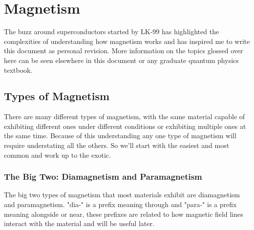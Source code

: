 
\section{Magnetism}
\label{showcase:magnetism}
The buzz around superconductors started by LK-99 has highlighted the complexities of understanding how magnetism works and has inspired me to write this document as personal revision.
More information on the topics glossed over here can be seen elsewhere in this document or any graduate quantum physics textbook.

\subsection{Types of Magnetism}
There are many different types of magnetism, 
with the same material capable of exhibiting different ones under different conditions or exhibiting multiple ones at the same time. 
Because of this understanding any one type of magnetism will require understating all the others.
So we'll start with the easiest and most common and work up to the exotic.

\begin{center}
\end{center}

\subsubsection{The Big Two: Diamagnetism and Paramagnetism}
The big two types of magnetism that most materials exhibit are diamagnetism and paramagnetism.
"dia-" is a prefix meaning through and "para-" is a prefix meaning alongside or near, 
these prefixes are related to how magnetic field lines interact with the material and will be useful later.
\\

